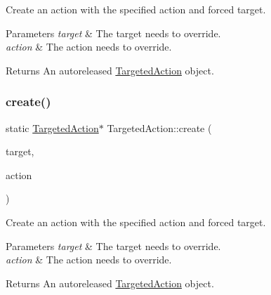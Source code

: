 Create an action with the specified action and forced target.


\begin{DoxyParams}{Parameters}
{\em target} & The target needs to override. \\
\hline
{\em action} & The action needs to override. \\
\hline
\end{DoxyParams}
\begin{DoxyReturn}{Returns}
An autoreleased \hyperlink{classTargetedAction}{Targeted\+Action} object. 
\end{DoxyReturn}
\mbox{\label{classTargetedAction_a1f2636cb594d4a90eedf5e13f1f6b6db}} 
\subsubsection{\texorpdfstring{create()}{create()}\hspace{0.1cm}{\footnotesize\ttfamily [2/2]}}
{\footnotesize\ttfamily static \hyperlink{classTargetedAction}{Targeted\+Action}$\ast$ Targeted\+Action\+::create (\begin{DoxyParamCaption}\item[{\hyperlink{classNode}{Node} $\ast$}]{target,  }\item[{\hyperlink{classFiniteTimeAction}{Finite\+Time\+Action} $\ast$}]{action }\end{DoxyParamCaption})\hspace{0.3cm}{\ttfamily [static]}}

Create an action with the specified action and forced target.


\begin{DoxyParams}{Parameters}
{\em target} & The target needs to override. \\
\hline
{\em action} & The action needs to override. \\
\hline
\end{DoxyParams}
\begin{DoxyReturn}{Returns}
An autoreleased \hyperlink{classTargetedAction}{Targeted\+Action} object. 
\end{DoxyReturn}
\mbox{\label{classTargetedAction_a3cc3da2403fbc082d8799c867ba7ae38}} 
